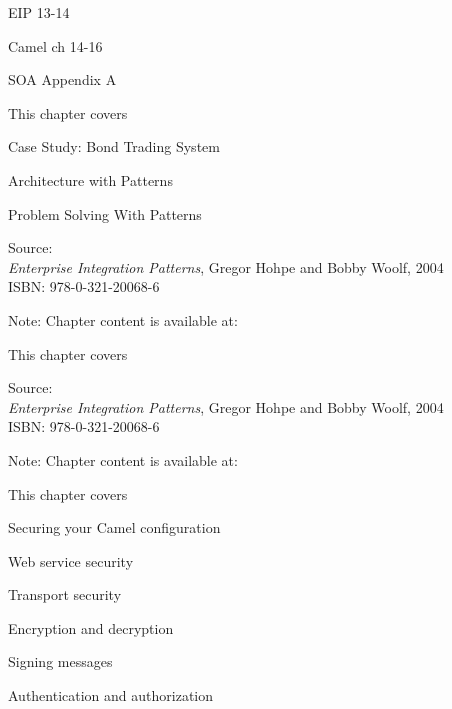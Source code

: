 \documentclass[Screen16to9,17pt]{foils}
\begin{document}

\begin{list1}
\item EIP 13-14
\item Camel ch 14-16
\item SOA Appendix A
\end{list1}


This chapter covers
\begin{list2}
\item Case Study: Bond Trading System
\item Architecture with Patterns
\item Problem Solving With Patterns
\end{list2}

Source: {\footnotesize\\
\emph{Enterprise Integration Patterns}, Gregor Hohpe and Bobby Woolf, 2004\\
ISBN: 978-0-321-20068-6}

Note: Chapter content is available at:\\


This chapter covers
\begin{list2}
\item
\end{list2}

Source: {\footnotesize\\
\emph{Enterprise Integration Patterns}, Gregor Hohpe and Bobby Woolf, 2004\\
ISBN: 978-0-321-20068-6}



Note: Chapter content is available at:\\




This chapter covers
\begin{list2}
\item Securing your Camel configuration
\item Web service security
\item Transport security
\item Encryption and decryption
\item Signing messages
\item Authentication and authorization
\end{list2}
\end{document}
